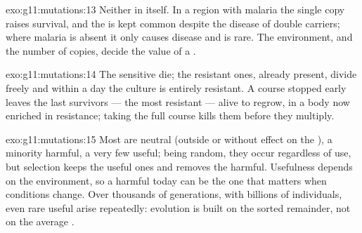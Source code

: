 \begin{solution}{exo:g11:mutations:13}
Neither in itself. In a region with malaria the single copy raises
survival, and the  is kept common despite the disease of double
carriers; where malaria is absent it only causes disease and is rare.
The environment, and the number of copies, decide the value of a
.
\end{solution}

\begin{solution}{exo:g11:mutations:14}
The sensitive  die; the resistant ones, already present, divide
freely and within a day the culture is entirely resistant. A course
stopped early leaves the last survivors --- the most resistant ---
alive to regrow, in a body now enriched in resistance; taking the full
course kills them before they multiply.
\end{solution}

\begin{solution}{exo:g11:mutations:15}
Most  are neutral (outside  or without effect on the
), a minority harmful, a very few useful; being random, they
occur regardless of use, but selection keeps the useful ones and
removes the harmful. Usefulness depends on the environment, so a
 harmful today can be the one that matters when conditions
change. Over thousands of generations, with billions of individuals,
even rare useful  arise repeatedly: evolution is built on the
sorted remainder, not on the average .
\end{solution}

